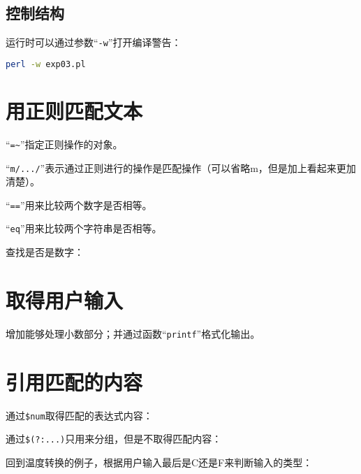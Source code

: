 

\subsection{控制结构}



运行时可以通过参数“\verb|-w|”打开编译警告：

\begin{lstlisting}[language=bash]
perl -w exp03.pl
\end{lstlisting}


\section{用正则匹配文本}

“\verb|=~|”指定正则操作的对象。

“\verb|m/.../|”表示通过正则进行的操作是匹配操作（可以省略m，但是加上看起来更加清楚）。

“\verb|==|”用来比较两个数字是否相等。

“\verb|eq|”用来比较两个字符串是否相等。

查找是否是数字：





\section{取得用户输入}

增加能够处理小数部分；并通过函数“\verb|printf|”格式化输出。





\section{引用匹配的内容}

通过\verb|$num|取得匹配的表达式内容：



通过\verb|$(?:...)|只用来分组，但是不取得匹配内容：



回到温度转换的例子，根据用户输入最后是C还是F来判断输入的类型：


